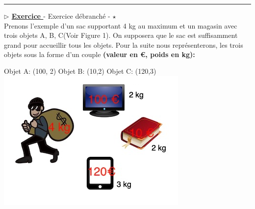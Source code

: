 \documentclass[12pt,french]{article}
\newcounter{npb}
\newcommand{\exo}{
    \stepcounter{npb}
    {\textbf{$\triangleright$ \underline{Exercice \arabic{npb} }}}
}
\begin{document}
\hrule
\exo  - Exercice débranché - $\star$ \\
Prenons l'exemple d'un sac supportant 4 kg au maximum et un magasin avec trois objets  A, B, C(Voir Figure 1). On supposera que le sac est suffisamment grand pour accueillir tous les objets.
Pour la suite nous représenterons, les trois objets sous la forme d'un couple  \textbf{(valeur en €, poids en kg):}
\vspace{2mm}
\begin{center}
	Objet A:  (100, 2)\hspace{1cm} Objet B:  (10,2)\hspace{1cm}  Objet C: (120,3)\\

	\includegraphics[scale=0.5]{Sac}
\end{center}
\end{document}
